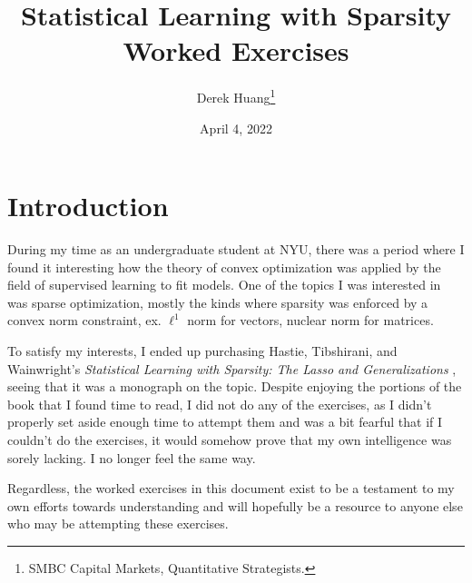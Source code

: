 \documentclass{article}
\title{Statistical Learning with Sparsity \\ \Large Worked Exercises}
\author{Derek Huang\thanks{SMBC Capital Markets, Quantitative Strategists.}}
\date{April 4, 2022}
\numberwithin{equation}{section}
\begin{document}
\newcommand{\newtocsubsection}[1]{%
    \subsection*{#1} \addcontentsline{toc}{subsection}{#1}%
}

\maketitle


\tableofcontents

\newpage

\section{Introduction}

During my time as an undergraduate student at NYU, there was a period where
I found it interesting how the theory of convex optimization was applied by
the field of supervised learning to fit models. One of the topics I was
interested in was sparse optimization, mostly the kinds where sparsity was
enforced by a convex norm constraint, ex. $ \ell^1 $ norm for vectors,
nuclear norm for matrices.

\medskip

To satisfy my interests, I ended up purchasing Hastie, Tibshirani, and
Wainwright's \textit{%
    Statistical Learning with Sparsity: The Lasso and Generalizations%
}, seeing that it was a monograph on the topic. Despite enjoying the portions
of the book that I found time to read, I did not do any of the exercises,
as I didn't properly set aside enough time to attempt them and was a bit fearful that if I couldn't do the exercises, it would somehow prove that my own intelligence was sorely lacking. I no longer feel the same way.

\medskip

Regardless, the worked exercises in this document exist to be a testament
to my own efforts towards understanding and will hopefully be a resource to
anyone else who may be attempting these exercises.

\medskip

\end{document}
